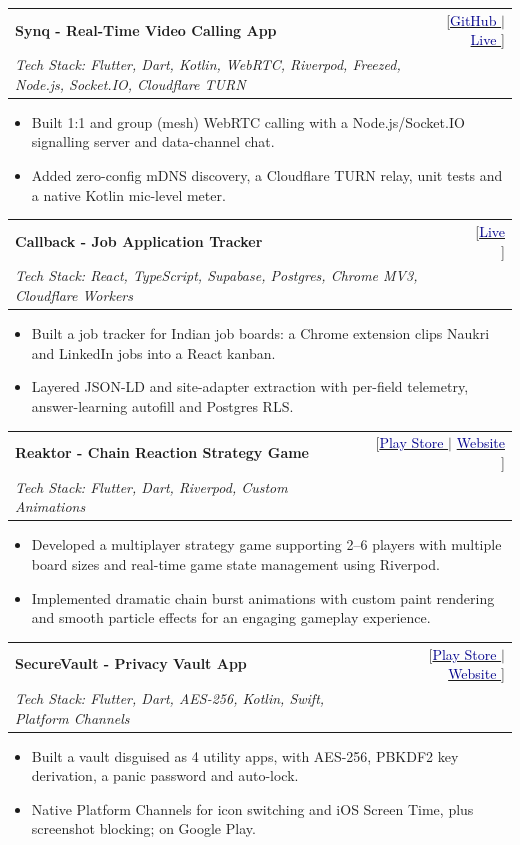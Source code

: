 \documentclass[a4paper,10pt]{article}
\makeatletter
\newcommand{\resumeProject}[4]{
  \item
    \begin{tabular*}{0.98\textwidth}[t]{l@{\extracolsep{\fill}}r}
      \textbf{#1} & \footnotesize{#3} \\[2pt]
      \footnotesize{\textit{#2}} & \footnotesize{#4}
    \end{tabular*}
}
\newcommand{\resumeItemListStart}{\vspace{-1.5mm}\begin{itemize}[leftmargin=*,labelsep=1mm,itemsep=1pt,topsep=0pt,parsep=0mm,partopsep=0mm]}
\newcommand{\resumeItemListEnd}{\end{itemize}\vspace{0mm}}
\makeatother
\begin{document}
\resumeProject
  {Synq - Real-Time Video Calling App \normalfont{\textit{}}}
  {Tech Stack: Flutter, Dart, Kotlin, WebRTC, Riverpod, Freezed, Node.js, Socket.IO, Cloudflare TURN}
  {[\href{https://github.com/jitendravjh/Synq}{\textcolor{darkblue}{GitHub }{\faGithub}} $|$ \href{https://jitendravjh.in/Synq/}{\textcolor{darkblue}{Live }{\faGlobe}}]}
  {}
\resumeItemListStart
  \item Built 1:1 and group (mesh) WebRTC calling with a Node.js/Socket.IO signalling server and data-channel chat.
  \item Added zero-config mDNS discovery, a Cloudflare TURN relay, unit tests and a native Kotlin mic-level meter.
\resumeItemListEnd

\resumeProject
  {Callback - Job Application Tracker \normalfont{\textit{}}}
  {Tech Stack: React, TypeScript, Supabase, Postgres, Chrome MV3, Cloudflare Workers}
  {{}[\href{https://callback.jitendravjh.in}{\textcolor{darkblue}{Live }{\faGlobe}}]}
  {}
\resumeItemListStart
  \item Built a job tracker for Indian job boards: a Chrome extension clips Naukri and LinkedIn jobs into a React kanban.
  \item Layered JSON-LD and site-adapter extraction with per-field telemetry, answer-learning autofill and Postgres RLS.
\resumeItemListEnd

\resumeProject
  {Reaktor - Chain Reaction Strategy Game \normalfont{\textit{}}}
  {Tech Stack: Flutter, Dart, Riverpod, Custom Animations}
  {{}[\href{https://play.google.com/store/apps/details?id=com.shravangoswami.reaktor}{\textcolor{darkblue}{Play Store }{\faGooglePlay}} $|$ \href{https://thecodechaos.github.io/reaktor/}{\textcolor{darkblue}{Website }{\faGlobe}}]}
  {}
\resumeItemListStart
  \item Developed a multiplayer strategy game supporting 2--6 players with multiple board sizes and real-time game state management using Riverpod.
  \item Implemented dramatic chain burst animations with custom paint rendering and smooth particle effects for an engaging gameplay experience.
\resumeItemListEnd

\resumeProject
  {SecureVault - Privacy Vault App \normalfont{\textit{}}}
  {Tech Stack: Flutter, Dart, AES-256, Kotlin, Swift, Platform Channels}
  {[\href{https://play.google.com/store/apps/details?id=com.shravangoswami.securevault}{\textcolor{darkblue}{Play Store }{\faGooglePlay}} $|$ \href{https://shravangoswami.com/SecureVault/}{\textcolor{darkblue}{Website }{\faGlobe}}]}
  {}
\resumeItemListStart
  \item Built a vault disguised as 4 utility apps, with AES-256, PBKDF2 key derivation, a panic password and auto-lock.
  \item Native Platform Channels for icon switching and iOS Screen Time, plus screenshot blocking; on Google Play.
\resumeItemListEnd
\end{document}
